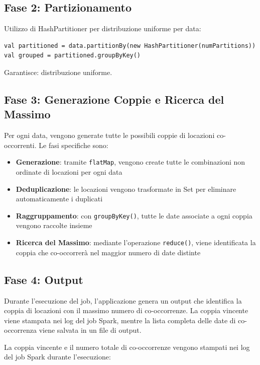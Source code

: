 \documentclass[8pt,a4paper]{article}
\begin{document}
\subsection{Fase 2: Partizionamento}
Utilizzo di HashPartitioner per distribuzione uniforme per data:
\begin{lstlisting}
val partitioned = data.partitionBy(new HashPartitioner(numPartitions))
val grouped = partitioned.groupByKey()
\end{lstlisting}

Garantisce: distribuzione uniforme.

\subsection{Fase 3: Generazione Coppie e Ricerca del Massimo}

Per ogni data, vengono generate tutte le possibili coppie di locazioni co-occorrenti. Le fasi specifiche sono:

\begin{itemize}
    \item \textbf{Generazione}: tramite \texttt{flatMap}, vengono create tutte le combinazioni non ordinate di locazioni per ogni data
    \item \textbf{Deduplicazione}: le locazioni vengono trasformate in Set per eliminare automaticamente i duplicati
    \item \textbf{Raggruppamento}: con \texttt{groupByKey()}, tutte le date associate a ogni coppia vengono raccolte insieme
    \item \textbf{Ricerca del Massimo}: mediante l'operazione \texttt{reduce()}, viene identificata la coppia che co-occorrerà nel maggior numero di date distinte
\end{itemize}

\subsection{Fase 4: Output}

Durante l'esecuzione del job, l'applicazione genera un output che identifica la coppia di locazioni con il massimo numero di co-occorrenze. La coppia vincente viene stampata nei log del job Spark, mentre la lista completa delle date di co-occorrenza viene salvata in un file di output.
\bigskip

\noindent
La coppia vincente e il numero totale di co-occorrenze vengono stampati nei log del job Spark durante l'esecuzione:
\end{document}

